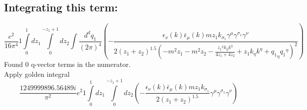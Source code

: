 \subsection*{Integrating this term:}
\begin{dmath}\frac{e^{2}}{16 \pi^{4}}1\int\limits_{ 0 }^{ 1 } d{ z_{ 1 } }\int\limits_{ 0 }^{ - { z_{ 1 } } + 1 } d{ z_{ 2 } }\int\frac{d^d q_1 }{ (2\pi)^4 }\left(- \frac{\epsilon_{ \nu }({ k }) \bar{\epsilon}_{ \mu }({ k }) m { z_{ 1 } } { { k }_{ \sigma_1 } } { \gamma^{ \mu } } { \gamma^{ \sigma_1 } } { \gamma^{ \nu } }}{2 \left({ z_{ 1 } } + { z_{ 2 } }\right)^{1.5} \left(- m^{2} { z_{ 1 } } - m^{2} { z_{ 2 } } - \frac{{ z_{ 1 } }^{2} { { k }_{ \eta } } { { k }^{ \eta } }}{4 { z_{ 1 } } + 4 { z_{ 2 } }} + { z_{ 1 } } { { k }_{ \eta } } { { k }^{ \eta } } + { { q_1 }_{ \eta } } { { q_1 }^{ \eta } }\right)^{2}}\right)\end{dmath}
Found 0 q-vector terms in the numerator.\\
Apply golden integral
\begin{dmath}\frac{1249999896.56489 i}{\pi^{2}} e^{2}1\int\limits_{ 0 }^{ 1 } d{ z_{ 1 } }\int\limits_{ 0 }^{ - { z_{ 1 } } + 1 } d{ z_{ 2 } }\left(- \frac{\epsilon_{ \nu }({ k }) \bar{\epsilon}_{ \mu }({ k }) m { z_{ 1 } } { { k }_{ \sigma_1 } }}{2 \left({ z_{ 1 } } + { z_{ 2 } }\right)^{1.5}} { \gamma^{ \mu } } { \gamma^{ \sigma_1 } } { \gamma^{ \nu } }\right)\end{dmath}
